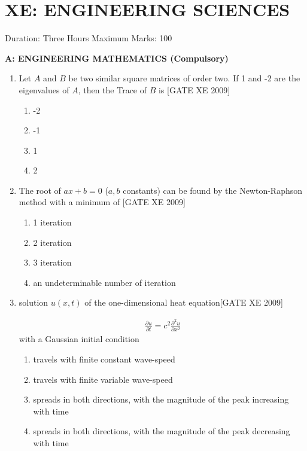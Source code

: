 \documentclass[journal,12pt,onecolumn]{IEEEtran}
\theoremstyle{remark}
\begin{document}
\section*{\hspace{1cm}XE: ENGINEERING SCIENCES}

     Duration: Three Hours \hspace{8 cm}  Maximum Marks: 100




\textbf{A: ENGINEERING MATHEMATICS (Compulsory)}



\begin{enumerate}

    \item Let $A$ and $B$ be two similar square matrices of order two. If 1 and -2 are the eigenvalues of $A$, then the Trace of $B$ is \hfill[GATE XE 2009]\\
    \begin{multicols}{4}
  \begin{enumerate}
      \item -2
       \item -1
       \item 1
        \item 2
  \end{enumerate}      
    \end{multicols}

  

    \item The root of $ax + b = 0$ ($a,b$ constants) can be found by the Newton-Raphson method with a minimum of \hfill[GATE XE 2009]
    
 \begin{multicols}{2}
\begin{enumerate}
 
\item  1 iteration 
\item 2 iteration 
\item 3 iteration 
\item an undeterminable number of iteration
\end{enumerate}
 \end{multicols}
    
   

   
    \item solution $u(x,t)$ of the one-dimensional heat equation\hfill[GATE XE 2009]
    
        
    \begin{align*}
        \frac{\partial u}{\partial t} = c^2 \frac{\partial^2 u}{\partial x^2}
    \end{align*}
    with a Gaussian initial condition
    \begin{enumerate}
        \item travels with finite constant wave-speed
        \item travels with finite variable wave-speed
        \item spreads in both directions, with the magnitude of the peak increasing with time
        \item spreads in both directions, with the magnitude of the peak decreasing with time
    \end{enumerate}


\end{enumerate}
\end{document}
